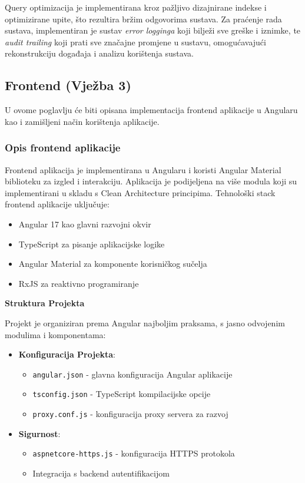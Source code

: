\documentclass[a4paper,12pt]{article}
\begin{document}
Query optimizacija je implementirana kroz pažljivo dizajnirane indekse i optimizirane upite, što rezultira bržim odgovorima sustava. Za praćenje rada sustava, implementiran je sustav \emph{error logginga} koji bilježi sve greške i iznimke, te \emph{audit trailing}  koji prati sve značajne promjene u sustavu, omogućavajući rekonstrukciju događaja i analizu korištenja sustava.

\newpage

\subsection{Frontend (Vježba 3)}

U ovome poglavlju će biti opisana implementacija frontend aplikacije u Angularu kao i zamišljeni način korištenja aplikacije.

\subsubsection{Opis frontend aplikacije}

Frontend aplikacija je implementirana u Angularu i koristi Angular Material biblioteku za izgled i interakciju. Aplikacija je podijeljena na više modula koji su implementirani u skladu s Clean Architecture principima. Tehnološki stack frontend aplikacije uključuje:

\begin{itemize}
    \item Angular 17 kao glavni razvojni okvir
    \item TypeScript za pisanje aplikacijske logike
    \item Angular Material za komponente korisničkog sučelja
    \item RxJS za reaktivno programiranje
\end{itemize}

\noindent\textbf{Struktura Projekta}

Projekt je organiziran prema Angular najboljim praksama, s jasno odvojenim modulima i komponentama:

\begin{itemize}
    \item \textbf{Konfiguracija Projekta}:
        \begin{itemize}
            \item \texttt{angular.json} - glavna konfiguracija Angular aplikacije
            \item \texttt{tsconfig.json} - TypeScript kompilacijske opcije
            \item \texttt{proxy.conf.js} - konfiguracija proxy servera za razvoj
        \end{itemize}
    
    \item \textbf{Sigurnost}:
        \begin{itemize}
            \item \texttt{aspnetcore-https.js} - konfiguracija HTTPS protokola
            \item Integracija s backend autentifikacijom
        \end{itemize}
\end{itemize}
\end{document}
